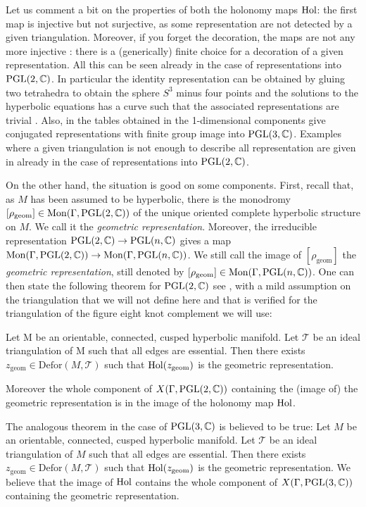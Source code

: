 Let us comment a bit on the properties of both the holonomy maps $\mathrm{Hol}$: the first map is injective but not surjective, as some representation are not detected by a given triangulation. Moreover, if you forget the decoration, the maps are not any more injective : there is a (generically) finite choice for a decoration of a given representation.  All this can be seen already in the case of representations
into $\textrm{PGL}(2,\mathbb{C})$. In particular the identity representation can be obtained by gluing two tetrahedra to obtain the 
sphere $S^3$ minus  four points and the solutions to the hyperbolic equations has a curve such that the associated representations are 
trivial \cite{SegTill}.  Also, in the tables obtained in \cite{BFGKR} the 1-dimensional components give conjugated representations with  finite group image into $\textrm{PGL}(3,\mathbb{C})$.
Examples where a given triangulation is not enough to describe all representation are given in \cite{SegTill} already in the case of
representations into $\textrm{PGL}(2,\mathbb{C})$.

On the other hand, the situation is good on some components. First, recall that, as $M$ has been assumed to be hyperbolic, there is the monodromy $[\rho_{\mathrm{geom}}]\in\mathrm{Mon}(\Gamma,\textrm{PGL}(2,\mathbb{C}))$ of the unique oriented complete hyperbolic structure on $M$. We call it the \emph{geometric representation}. Moreover, the irreducible representation $\textrm{PGL}(2,\mathbb{C})\to\textrm{PGL}(n,\mathbb{C})$ gives a map $\mathrm{Mon}(\Gamma,\textrm{PGL}(2,\mathbb{C}))\to\mathrm{Mon}(\Gamma,\textrm{PGL}(n,\mathbb{C}))$. We still call the image of $[\rho_{\mathrm{geom}}]$ the \emph{geometric representation}, still denoted by $[\rho_{\mathrm{geom}}]\in\mathrm{Mon}(\Gamma,\textrm{PGL}(n,\mathbb{C}))$. One can then state the following theorem for $\textrm{PGL}(2,\mathbb{C})$ see \cite{Thurston,SegTill}, with a mild assumption on the triangulation that we will not define here and that is verified for the triangulation of the figure eight knot complement we will use:

\begin{theorem} Let M be an orientable, connected, cusped hyperbolic manifold.  Let $\mathcal{T}$
be an ideal triangulation of M such that all edges are essential.  Then there exists $z_{\mathrm{geom}}\in \mathrm{Defor}(M,\mathcal{T})$
such that $\mathrm{Hol}(z_{\mathrm{geom}})$ is the geometric representation.  

Moreover the whole  component of $X(\Gamma,\textrm{PGL}(2,\mathbb{C}))$ containing the (image of) the geometric representation is in the image  of the holonomy map $\mathrm{Hol}$.
\end{theorem}

The analogous theorem in the case of $\textrm{PGL}(3,\mathbb{C})$ is believed to be true:  
Let $M$ be an orientable, connected, cusped hyperbolic manifold.  Let $\mathcal{T}$
be an ideal triangulation of $M$ such that all edges are essential.  Then there exists $z_{\mathrm{geom}}\in \mathrm{Defor}(M,\mathcal{T})$
such that $\mathrm{Hol}(z_{\mathrm{geom}})$ is the geometric representation. We believe that the image of $\mathrm{Hol}$ contains the whole  component of $X(\Gamma,\textrm{PGL}(3,\mathbb{C}))$ containing the geometric representation.


